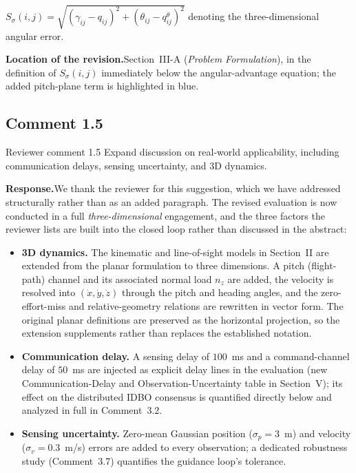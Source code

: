 \documentclass[11pt]{article}
\newcommand{\rsp}{\medskip\noindent\textbf{Response.}\quad}
\newcommand{\loc}{\medskip\noindent\textbf{Location of the revision.}\quad}
\begin{document}
\begin{manuscripttext}
$S_{\sigma}(i,j) = \sqrt{(\gamma_{ij} - q_{ij})^2 + (\theta_{ij} - q^{\theta}_{ij})^2}$ denoting the three-dimensional angular error.
\end{manuscripttext}

\loc Section~III-A (\emph{Problem Formulation}), in the definition of $S_{\sigma}(i,j)$ immediately below the angular-advantage equation; the added pitch-plane term is highlighted in blue.




\subsection*{Comment 1.5}

\begin{reviewercomment}{Reviewer comment 1.5}
Expand discussion on real-world applicability, including communication delays,
sensing uncertainty, and 3D dynamics.
\end{reviewercomment}

\rsp We thank the reviewer for this suggestion, which we have addressed structurally
rather than as an added paragraph. The revised evaluation is now conducted in a full
\emph{three-dimensional} engagement, and the three factors the reviewer lists are
built into the closed loop rather than discussed in the abstract:
\begin{itemize}
  \item \textbf{3D dynamics.} The kinematic and line-of-sight models in Section~II are
  extended from the planar formulation to three dimensions. A pitch (flight-path)
  channel and its associated normal load $n_z$ are added, the velocity is resolved
  into $(\dot x,\dot y,\dot z)$ through the pitch and heading angles, and the
  zero-effort-miss and relative-geometry relations are rewritten in vector form. The
  original planar definitions are preserved as the horizontal projection, so the
  extension supplements rather than replaces the established notation.
  \item \textbf{Communication delay.} A sensing delay of $100$~ms and a command-channel
  delay of $50$~ms are injected as explicit delay lines in the evaluation (new
  Communication-Delay and Observation-Uncertainty table in Section~V); its effect on the
  distributed IDBO consensus is quantified directly below and analyzed in full in
  Comment~3.2.
  \item \textbf{Sensing uncertainty.} Zero-mean Gaussian position ($\sigma_p=3$~m) and
  velocity ($\sigma_v=0.3$~m/s) errors are added to every observation; a dedicated
  robustness study (Comment~3.7) quantifies the guidance loop's tolerance.
\end{itemize}
\end{document}
